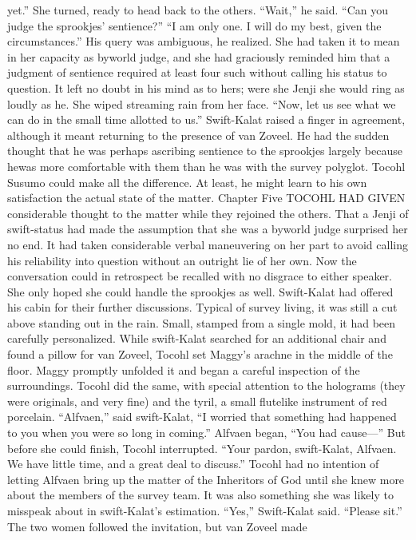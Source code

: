 \documentclass[9pt]{article}
\begin{document}
yet.” She turned, ready to head back to the others.
“Wait,” he said. “Can you judge the sprookjes’ sentience?”
“I am only one. I will do my best, given the circumstances.”
His query was ambiguous, he realized. She had taken it to mean in her capacity as byworld judge,
and she had graciously reminded him that a judgment of sentience required at least four such without
calling his status to question. It left no doubt in his mind as to hers; were she Jenji she would ring as
loudly as he.
She wiped streaming rain from her face. “Now, let us see what we can do in the small time allotted to
us.”
Swift-Kalat raised a finger in agreement, although it meant returning to the presence of van Zoveel.
He had the sudden thought that he was perhaps ascribing sentience to the sprookjes largely because hewas more comfortable with them than he was with the survey polyglot. Tocohl Susumo could make all
the difference. At least, he might learn to his own satisfaction the actual state of the matter.
Chapter Five
TOCOHL HAD GIVEN considerable thought to the matter while they rejoined the others. That a
Jenji of swift-status had made the assumption that she was a byworld judge surprised her no end. It had
taken considerable verbal maneuvering on her part to avoid calling his reliability into question without an
outright lie of her own. Now the conversation could in retrospect be recalled with no disgrace to either
speaker. She only hoped she could handle the sprookjes as well.
Swift-Kalat had offered his cabin for their further discussions. Typical of survey living, it was still a
cut above standing out in the rain. Small, stamped from a single mold, it had been carefully personalized.
While swift-Kalat searched for an additional chair and found a pillow for van Zoveel, Tocohl set
Maggy’s arachne in the middle of the floor. Maggy promptly unfolded it and began a careful inspection of
the surroundings. Tocohl did the same, with special attention to the holograms (they were originals, and
very fine) and the tyril, a small flutelike instrument of red porcelain.
“Alfvaen,” said swift-Kalat, “I worried that something had happened to you when you were so long
in coming.”
Alfvaen began, “You had cause—”
But before she could finish, Tocohl interrupted. “Your pardon, swift-Kalat, Alfvaen. We have little
time, and a great deal to discuss.” Tocohl had no intention of letting Alfvaen bring up the matter of the
Inheritors of God until she knew more about the members of the survey team. It was also something she
was likely to misspeak about in swift-Kalat’s estimation.
“Yes,” Swift-Kalat said. “Please sit.” The two women followed the invitation, but van Zoveel made
\end{document}
